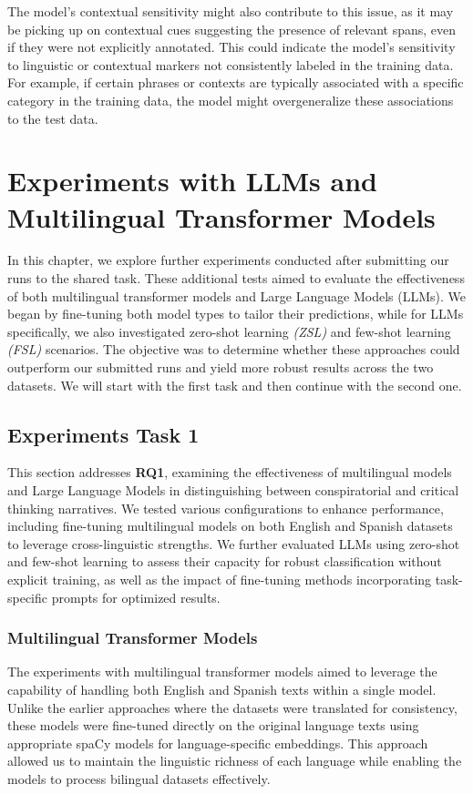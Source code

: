 \documentclass{Configuration_Files/PoliMi3i_thesis}
\begin{document}
The model's contextual sensitivity might also contribute to this issue, as it may be picking up on contextual cues suggesting the presence of relevant spans, even if they were not explicitly annotated. This could indicate the model's sensitivity to linguistic or contextual markers not consistently labeled in the training data. For example, if certain phrases or contexts are typically associated with a specific category in the training data, the model might overgeneralize these associations to the test data.


\chapter{Experiments with LLMs and Multilingual Transformer Models} \label{chap:experiments_LLMs_multilingual}
In this chapter, we explore further experiments conducted after submitting our runs to the shared task. These additional tests aimed to evaluate the effectiveness of both multilingual transformer models and Large Language Models (LLMs). We began by fine-tuning both model types to tailor their predictions, while for LLMs specifically, we also investigated zero-shot learning \textit{(ZSL)} and few-shot learning \textit{(FSL)} scenarios. The objective was to determine whether these approaches could outperform our submitted runs and yield more robust results across the two datasets. We will start with the first task and then continue with the second one.

\section{Experiments Task 1}
This section addresses \textbf{RQ1}, examining the effectiveness of multilingual models and Large Language Models in distinguishing between conspiratorial and critical thinking narratives. We tested various configurations to enhance performance, including fine-tuning multilingual models on both English and Spanish datasets to leverage cross-linguistic strengths. We further evaluated LLMs using zero-shot and few-shot learning to assess their capacity for robust classification without explicit training, as well as the impact of fine-tuning methods incorporating task-specific prompts for optimized results.

\subsection{Multilingual Transformer Models}
The experiments with multilingual transformer models aimed to leverage the capability of handling both English and Spanish texts within a single model. Unlike the earlier approaches where the datasets were translated for consistency, these models were fine-tuned directly on the original language texts using appropriate spaCy models for language-specific embeddings. This approach allowed us to maintain the linguistic richness of each language while enabling the models to process bilingual datasets effectively.
\end{document}
